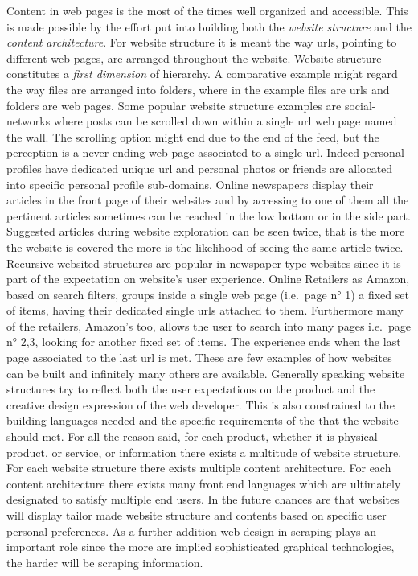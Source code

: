\documentclass[
  12pt,
  a4paper,
  oneside]{book}
\theoremstyle{definition}
\theoremstyle{definition}
\theoremstyle{definition}
\theoremstyle{remark}
\begin{document}
Content in web pages is the most of the times well organized and accessible.
This is made possible by the effort put into building both the \emph{website structure} and the \emph{content architecture}. For website structure it is meant the way urls, pointing to different web pages, are arranged throughout the website.
Website structure constitutes a \emph{first dimension} of hierarchy. A comparative example might regard the way files are arranged into folders, where in the example files are urls and folders are web pages.
Some popular website structure examples are social-networks where posts can be scrolled down within a single url web page named the wall. The scrolling option might end due to the end of the feed, but the perception is a never-ending web page associated to a single url. Indeed personal profiles have dedicated unique url and personal photos or friends are allocated into specific personal profile sub-domains.
Online newspapers display their articles in the front page of their websites and by accessing to one of them all the pertinent articles sometimes can be reached in the low bottom or in the side part. Suggested articles during website exploration can be seen twice, that is the more the website is covered the more is the likelihood of seeing the same article twice. Recursive websited structures are popular in newspaper-type websites since it is part of the expectation on website's user experience.
Online Retailers as Amazon, based on search filters, groups inside a single web page (i.e.~page n° 1) a fixed set of items, having their dedicated single urls attached to them. Furthermore many of the retailers, Amazon's too, allows the user to search into many pages i.e.~page n° 2,3, looking for another fixed set of items. The experience ends when the last page associated to the last url is met.
These are few examples of how websites can be built and infinitely many others are available.
Generally speaking website structures try to reflect both the user expectations on the product and the creative design expression of the web developer. This is also constrained to the building languages needed and the specific requirements of the that the website should met. For all the reason said, for each product, whether it is physical product, or service, or information there exists a multitude of website structure. For each website structure there exists multiple content architecture. For each content architecture there exists many front end languages which are ultimately designated to satisfy multiple end users. In the future chances are that websites will display tailor made website structure and contents based on specific user personal preferences. As a further addition web design in scraping plays an important role since the more are implied sophisticated graphical technologies, the harder will be scraping information.
\end{document}

